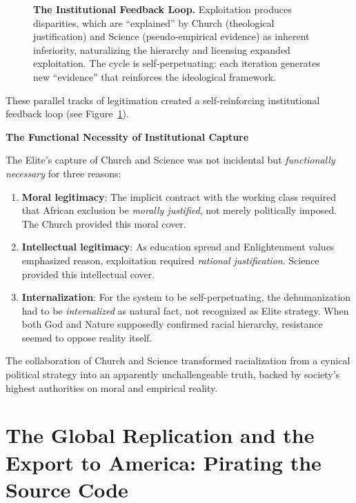 \documentclass[12pt,openany]{book}
\begin{document}
\begin{figure}[htbp]
\caption{\textbf{The Institutional Feedback Loop.} Exploitation produces disparities, which are ``explained'' by Church (theological justification) and Science (pseudo-empirical evidence) as inherent inferiority, naturalizing the hierarchy and licensing expanded exploitation. The cycle is self-perpetuating: each iteration generates new ``evidence'' that reinforces the ideological framework.}
\label{fig:feedback_loop}
\end{figure}

These parallel tracks of legitimation created a self-reinforcing institutional feedback loop (see Figure~\ref{fig:feedback_loop}).

\textbf{The Functional Necessity of Institutional Capture}

The Elite's capture of Church and Science was not incidental but \textit{functionally necessary} for three reasons:

\begin{enumerate}
    \item \textbf{Moral legitimacy}: The implicit contract with the working class required that African exclusion be \textit{morally justified}, not merely politically imposed. The Church provided this moral cover.
    
    \item \textbf{Intellectual legitimacy}: As education spread and Enlightenment values emphasized reason, exploitation required \textit{rational justification}. Science provided this intellectual cover.
    
    \item \textbf{Internalization}: For the system to be self-perpetuating, the dehumanization had to be \textit{internalized} as natural fact, not recognized as Elite strategy. When both God and Nature supposedly confirmed racial hierarchy, resistance seemed to oppose reality itself.
\end{enumerate}

The collaboration of Church and Science transformed racialization from a cynical political strategy into an apparently unchallengeable truth, backed by society's highest authorities on moral and empirical reality.

\section{The Global Replication and the Export to America: Pirating the Source Code}
\end{document}

